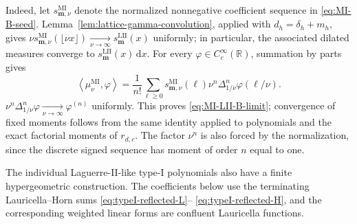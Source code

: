 \documentclass[10pt]{amsart}
\newcommand{\dd}{\,\mathrm d}
\newcommand{\mm}{\boldsymbol m}
\theoremstyle{plain}
\theoremstyle{definition}
\theoremstyle{remark}
\begin{document}
Indeed, let \(s_{\mm,\nu}^{\mathrm{MI}}\) denote the normalized nonnegative
coefficient sequence in \eqref{eq:MI-B-seed}.
Lemma~\ref{lem:lattice-gamma-convolution}, applied with
\(d_h=\delta_h+m_h\), gives
\(\nu s_{\mm,\nu}^{\mathrm{MI}}(\lfloor\nu x\rfloor)
\xrightarrow[\nu\to\infty]{}s_{\mm}^{\mathrm{LII}}(x)\) uniformly; in particular, the associated
dilated measures converge to
\(s_{\mm}^{\mathrm{LII}}(x)\dd x\). For every
\(\varphi\in C_c^\infty(\mathbb R)\), summation by parts gives
\[
 \left\langle\mu_{\nu}^{\mathrm{MI}},\varphi\right\rangle
 =\frac1{n!}\sum_{\ell\ge0}s_{\mm,\nu}^{\mathrm{MI}}(\ell)
 \nu^n\Delta_{1/\nu}^n\varphi(\ell/\nu).
\]
\(\nu^n\Delta_{1/\nu}^n\varphi
\xrightarrow[\nu\to\infty]{}\varphi^{(n)}\) uniformly. This proves
\eqref{eq:MI-LII-B-limit}; convergence of fixed moments follows from the
same identity applied to polynomials and the exact factorial moments of
\(r_{d,c}\). The factor \(\nu^n\) is also forced by the normalization, since
the discrete signed sequence has moment of order \(n\) equal to one.

The individual Laguerre-II-like type-I polynomials also have a finite
hypergeometric construction. The coefficients below use the terminating
Lauricella--Horn sums \eqref{eq:typeI-reflected-L}--
\eqref{eq:typeI-reflected-H}, and the corresponding weighted linear forms
are confluent Lauricella functions.
\end{document}
